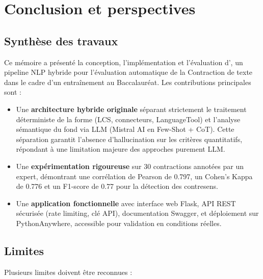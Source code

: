 \chapter*{Conclusion et perspectives}

\section*{Synthèse des travaux}

Ce mémoire a présenté la conception, l'implémentation et l'évaluation d'\AZIZA, un pipeline NLP hybride pour l'évaluation automatique de la Contraction de texte dans le cadre d'un entraînement au Baccalauréat. Les contributions principales sont :

\begin{itemize}
    \item Une \textbf{architecture hybride originale} séparant strictement le traitement déterministe de la forme (LCS, connecteurs, LanguageTool) et l'analyse sémantique du fond via LLM (Mistral AI en Few-Shot + CoT). Cette séparation garantit l'absence d'hallucination sur les critères quantitatifs, répondant à une limitation majeure des approches purement LLM.
    \item Une \textbf{expérimentation rigoureuse} sur 30 contractions annotées par un expert, démontrant une corrélation de Pearson de 0.797, un Cohen's Kappa de 0.776 et un F1-score de 0.77 pour la détection des contresens.
    \item Une \textbf{application fonctionnelle} avec interface web Flask, API REST sécurisée (rate limiting, clé API), documentation Swagger, et déploiement sur PythonAnywhere, accessible pour validation en conditions réelles.
\end{itemize}

\section*{Limites}

Plusieurs limites doivent être reconnues :

